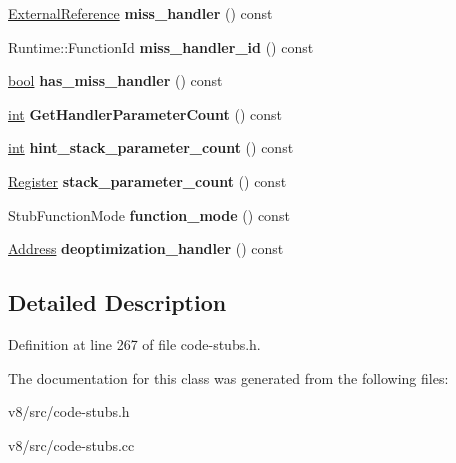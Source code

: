 \begin{DoxyCompactItemize}
\item 
\mbox{\label{classv8_1_1internal_1_1CodeStubDescriptor_ae8efb53e1f6828dea51f435c5183ac55}} 
\mbox{\hyperlink{classv8_1_1internal_1_1ExternalReference}{External\+Reference}} {\bfseries miss\+\_\+handler} () const
\item 
\mbox{\label{classv8_1_1internal_1_1CodeStubDescriptor_a6f0b084c14315bbd0b852ecf476384b6}} 
Runtime\+::\+Function\+Id {\bfseries miss\+\_\+handler\+\_\+id} () const
\item 
\mbox{\label{classv8_1_1internal_1_1CodeStubDescriptor_a1a64ea054755f002501c99bcceb0bb3f}} 
\mbox{\hyperlink{classbool}{bool}} {\bfseries has\+\_\+miss\+\_\+handler} () const
\item 
\mbox{\label{classv8_1_1internal_1_1CodeStubDescriptor_a1555aab1ed3bf69a15a301df86d0de4e}} 
\mbox{\hyperlink{classint}{int}} {\bfseries Get\+Handler\+Parameter\+Count} () const
\item 
\mbox{\label{classv8_1_1internal_1_1CodeStubDescriptor_a3468ffd74f6ac45cadb0d24b9d60016a}} 
\mbox{\hyperlink{classint}{int}} {\bfseries hint\+\_\+stack\+\_\+parameter\+\_\+count} () const
\item 
\mbox{\label{classv8_1_1internal_1_1CodeStubDescriptor_adf8dd00b6d7e0a8f97afba8f16762c10}} 
\mbox{\hyperlink{classv8_1_1internal_1_1Register}{Register}} {\bfseries stack\+\_\+parameter\+\_\+count} () const
\item 
\mbox{\label{classv8_1_1internal_1_1CodeStubDescriptor_ad73ffc45a1f8f5def94863ed40dfe6c2}} 
Stub\+Function\+Mode {\bfseries function\+\_\+mode} () const
\item 
\mbox{\label{classv8_1_1internal_1_1CodeStubDescriptor_a281b171fa1d3d9bbd0487f48aa51d870}} 
\mbox{\hyperlink{classuintptr__t}{Address}} {\bfseries deoptimization\+\_\+handler} () const
\end{DoxyCompactItemize}


\subsection{Detailed Description}


Definition at line 267 of file code-\/stubs.\+h.



The documentation for this class was generated from the following files\+:\begin{DoxyCompactItemize}
\item 
v8/src/code-\/stubs.\+h\item 
v8/src/code-\/stubs.\+cc\end{DoxyCompactItemize}
